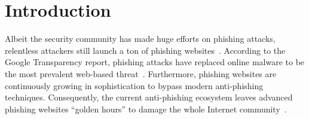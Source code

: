 \section{Introduction}
\label{s:intro}
Albeit the security community has made huge efforts on phishing attacks,
relentless attackers still launch a ton of phishing websites~\cite{ho2019detecting, van2019cognitive}.
According to the Google Transparency report, phishing attacks have replaced online malware to be the most prevalent web-based threat~\cite{googletransparencyreport, solutions2019verizon}.
Furthermore, phishing websites are continuously growing in sophistication to bypass modern anti-phishing techniques.
Consequently, the current anti-phishing ecosystem leaves advanced phishing websites ``golden hours'' to damage the whole Internet community~\cite{oest2020sunrise}.

